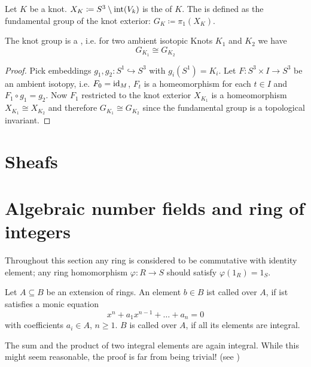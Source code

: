 \begin{definition}
	Let $K$ be a knot. $X_K \coloneqq S^3 \setminus \operatorname{int}(V_k)$ is the  of $K$.
	The  is defined as the fundamental group of the knot exterior: $G_K \coloneqq \pi_1(X_K)$.
\end{definition}

\begin{lemma}
	The knot group is a , i.e. for two ambient isotopic Knots $K_1$ and $K_2$ we have
	\[
		G_{K_1} \cong G_{K_2}
	\]
\end{lemma}
\begin{proof}
	Pick embeddings $g_1, g_2 \colon S^1 \hookrightarrow S^3$ with $g_i(S^1)=K_i$.
	Let $F \colon S^3 \times I \to S^3$ be an ambient isotopy, i.e. $F_0 = {\operatorname{id}_M}$, $F_t$ is a homeomorphism for each $t \in I$ and $F_1 \circ g_1 = g_2$.
	Now $F_1$ restricted to the knot exterior $X_{K_1}$ is a homeomorphism $X_{K_1} \cong X_{K_2}$ and therefore $G_{K_1} \cong G_{K_2}$ since the fundamental group is a topological invariant.
\end{proof}





\section{Sheafs} %
\label{sec:sheafs}



\section{Algebraic number fields and ring of integers} %
\label{sec:rings_and_ideals}
Throughout this section any ring is considered to be commutative with identity element; any ring homomorphism $\varphi \colon R \to S$ should satisfy $\varphi(1_R) =1_S$.

\begin{definition}[{name=[Integral Elements]{\cite[Def.~2.1]{neukirch}}}]
	Let $A \subseteq B$ be an extension of rings.
	An element $b \in B$ ist called  over $A$, if ist satisfies a monic equation
	\[
		x^n + a_1 x^{n-1} + \ldots + a_n =0
	\]
	with coefficients $a_i \in A$, $n\ge 1$.
	$B$ is called  over $A$, if all its elements are integral.
\end{definition}

\begin{remark}
	The sum and the product of two integral elements are again integral.
	While this might seem reasonable, the proof is far from being trivial! (see \textcite[Prop.~2.2]{neukirch})
\end{remark}

